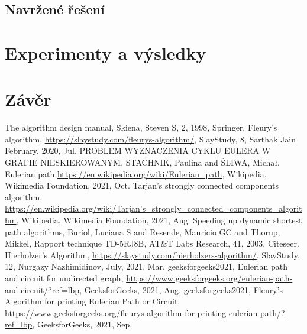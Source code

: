 \documentclass[12pt]{article}
\begin{document}
\subsection{Navržené řešení}

\section{Experimenty a výsledky}
\section{Závěr}

\begin{thebibliography}{9}

		The algorithm design manual,
		Skiena, Steven S,	
		2,
		1998,
		Springer.
	     	Fleury's algorithm,
	     	\url {https://slaystudy.com/fleurys-algorithm/}, 
		SlayStudy, 
		8, Sarthak Jain February, 
		2020, 
		Jul.
		PROBLEM WYZNACZENIA CYKLU EULERA W GRAFIE NIESKIEROWANYM,
		STACHNIK, Paulina and {\'S}LIWA, Micha{\l}.
 	  	 Eulerian path
	  	 \url {https://en.wikipedia.org/wiki/Eulerian_path}, 
	  	 Wikipedia,
	  	 Wikimedia Foundation,
	   	2021, 
	   	Oct.
		Tarjan's strongly connected components algorithm,
		\url {https://en.wikipedia.org/wiki/Tarjan's_strongly_connected_components_algorithm},
		Wikipedia,
		Wikimedia Foundation,
		2021,
		Aug.
		Speeding up dynamic shortest path algorithms,
 		Buriol, Luciana S and Resende, Mauricio GC and Thorup, Mikkel,
		Rapport technique TD-5RJ8B, AT\&T Labs Research,
  		41,
  		2003,
  		Citeseer.
		Hierholzer's Algorithm,
		\url {https://slaystudy.com/hierholzers-algorithm/},
 		SlayStudy,
		12, Nurgazy Nazhimidinov,
		July, 
		2021, 
		Mar.
		geeksforgeeks2021,
 		Eulerian path and circuit for undirected graph,
		\url {https://www.geeksforgeeks.org/eulerian-path-and-circuit/?ref=lbp}, 
		GeeksforGeeks, 
		2021,	
		Aug.
		geeksforgeeks2021,
		Fleury's Algorithm for printing Eulerian Path or Circuit, 
		\url {https://www.geeksforgeeks.org/fleurys-algorithm-for-printing-eulerian-path/?ref=lbp}, 
		GeeksforGeeks,
		2021, 
		Sep.

 \end{thebibliography}
\end{document}
